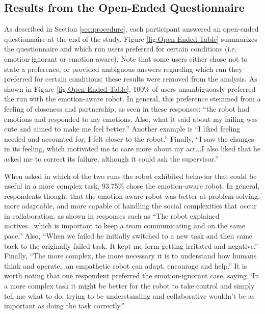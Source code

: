 \documentclass{sig-alternate-05-2015}
\begin{document}
\subsection{Results from the Open-Ended Questionnaire} 
\label{sec:Open-Ended}
As described in Section \ref{sec:procedure}, each participant answered an open-ended
questionnaire at the end of the study. Figure \ref{fig:Open-Ended-Table}
summarizes the questionnaire and which run users preferred for certain
conditions (i.e. emotion-ignorant or emotion-aware). Note that some users either
chose not to state a preference, or provided ambiguous answers regarding which
run they preferred for certain conditions; these results were removed from the analysis.
As shown in Figure \ref{fig:Open-Ended-Table}, 100\% of users unambiguously
preferred the run with the emotion-aware robot. In general, this preference
stemmed from a feeling of closeness and partnership, as seen in these responses:
``the robot had emotions and responded to my emotions. Also, what it said about
my failing was cute and aimed to make me feel better.'' Another example is ``I
liked feeling needed and accounted for; I felt closer to the robot.'' Finally,
``I saw the changes in its feeling, which motivated me to care more about my
act...I also liked that he asked me to correct its failure, although it could
ask the supervisor.''  

When asked in which of the two runs the robot exhibited
behavior that could be useful in a more complex task, 93.75\% chose the
emotion-aware robot. In general, respondents thought that the emotion-aware
robot was better at problem solving, more adaptable, and more capable of
handling the social complexities that occur in collaboration, as shown in
responses such as ``The robot explained motives...which is important to keep a
team communicating and on the same pace.'' Also, ``When we failed he initially
switched to a new task and then came back to the originally failed task. It kept
me form getting irritated and negative.'' Finally, ``The more complex, the more
necessary it is to understand how humans think and operate...an empathetic robot
can adapt, encourage and help.'' It is worth noting that one respondent
preferred the emotion-ignorant case, saying ``In a more complex task it might be
better for the robot to take control and simply tell me what to do; trying to be
understanding and collaborative wouldn't be as important as doing the task
correctly.'' 
\end{document}
